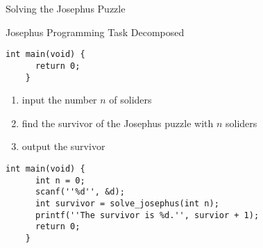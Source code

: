 \begin{frame}{}
  \centerline{\LARGE Solving the Josephus Puzzle}
\end{frame}

\begin{frame}[fragile]{Josephus Programming Task Decomposed}



  \begin{lstlisting}[style = Cstyle]
    int main(void) {
      return 0;
    }
  \end{lstlisting}
  \vspace{0.20cm}

  {\it
    \begin{enumerate}
      \setlength{\itemsep}{6pt}
      \item input the number $n$ of soliders
      \item find the survivor of the Josephus puzzle with $n$ soliders
      \item output the survivor
    \end{enumerate}
  }

  \vspace{0.20cm}
  \pause
  \begin{lstlisting}[style = Cstyle]
    int main(void) {
      int n = 0;
      scanf(''%d'', &d);
      int survivor = solve_josephus(int n);
      printf(''The survivor is %d.'', survior + 1);
      return 0;
    }
  \end{lstlisting}
\end{frame}

